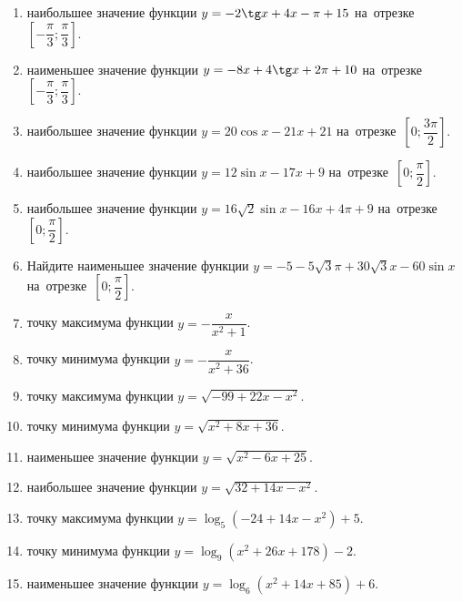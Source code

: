 \documentclass[a4paper,10pt]{article}
\begin{document}
\begin{enumerate}
\item {} наибольшее значение функции $y=-2\tg x +4x-\pi +15$ на~отрезке~$\left[-\dfrac{\pi}{3};\dfrac{\pi}{3}\right]$.

\item {} наименьшее значение функции $y=-8x +4\tg x+2\pi+10$ на~отрезке~$\left[-\dfrac{\pi}{3};\dfrac{\pi}{3}\right]$.

\item {} наибольшее значение функции $y=20\cos x-21x+21$ на~отрезке~$\left[0;\dfrac{3\pi}{2}\right]$.

\item {} наибольшее значение функции $y=12\sin x-17x+9$ на~отрезке~$\left[0;\dfrac{\pi}{2}\right]$.

\item {} наибольшее значение функции $y=16\sqrt{2}\sin x-16x+4\pi +9$ на~отрезке~$\left[0;\dfrac{\pi}{2}\right]$.

\item Найдите наименьшее значение функции $y=-5-5\sqrt{3}\pi+30\sqrt{3}x-60\sin x$ на~отрезке~$\left[0;\dfrac{\pi}{2}\right]$.

\item {} точку максимума функции $y=-\dfrac{x}{ x^2 +1}$.

\item {} точку минимума функции $y=-\dfrac{x}{ x^2 +36}$.

\item {} точку максимума функции $y=\sqrt{-99+22x-x^2}$.

\item {} точку минимума функции $y=\sqrt{x^2+8x+36}$.

\item {} наименьшее значение функции $y=\sqrt{x^2-6x+25}$.

\item {} наибольшее значение функции $y=\sqrt{32+14x-x^2}$.

\item {} точку максимума функции $y=\log_5\left(-24+14x-x^2\right)+5$.

\item {} точку минимума функции $y=\log_9\left(x^2+26x+178\right)-2$.

\item {} наименьшее значение функции $y=\log_6\left(x^2+14x+85\right)+6$.


\end{enumerate}
\end{document}
